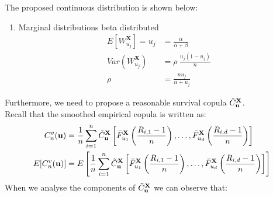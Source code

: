 \documentclass[12pt]{report}
\newcommand{\1}{\mathbf{1}}
\begin{document}
\begin{flushleft}
\newpage
The proposed continuous distribution is shown below:
\begin{enumerate}
\item Marginal distributions beta distributed
\begin{align*}
E[W^{\textbf{X}}_{u_{j}}] = u_{j} &= \frac{\alpha}{\alpha + \beta} \\
Var(W^{\textbf{X}}_{u_{j}}) &= \rho \: \frac{u_{j} (1 - u_{j})}{n}\\
\rho &= \frac{n u_{j}}{\alpha + u_{j}}
\end{align*}
\end{enumerate}

Furthermore, we need to propose a reasonable survival copula $\Tilde{C}_{\textbf{u}}^{\textbf{X}}$. \\
\vspace{0.5cm}
Recall that the smoothed empirical copula is written as:
\begin{align*}
C_{n}^{v}(\textbf{u}) &= \frac{1}{n} \sum\limits_{i = 1}^{n} \Tilde{C}_{\textbf{u}}^{\textbf{X}} \left[\Bar{F}_{u_{1}}^{\textbf{X}}\left(\frac{R_{i,1} - 1}{n}\right), \dots, \Bar{F}_{u_{d}}^{\textbf{X}}\left(\frac{R_{i,d} - 1}{n}\right) \right]\\
E[C_{n}^{v}(\textbf{u})] &= E \left[ \frac{1}{n} \sum\limits_{i = 1}^{n} \Tilde{C}_{\textbf{u}}^{\textbf{X}} \left[\Bar{F}_{u_{1}}^{\textbf{X}}\left(\frac{R_{i,1} - 1}{n}\right), \dots, \Bar{F}_{u_{d}}^{\textbf{X}}\left(\frac{R_{i,d} - 1}{n}\right) \right] \right]
\end{align*}
When we analyse the components of $\Tilde{C}_{\textbf{u}}^{\textbf{X}}$ \parencite{KojadinovicYi2024Smooth} we can observe that:


\end{flushleft}
\end{document}
